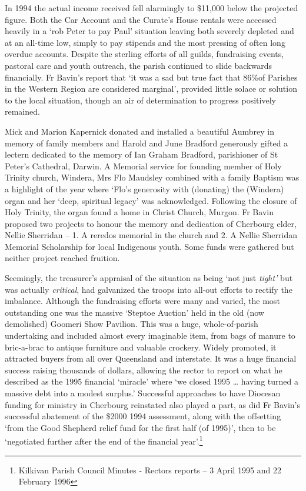 In 1994 the actual income received fell alarmingly to \$11,000 below the projected figure. Both the Car Account and the Curate's House rentals were accessed heavily in a `rob Peter to pay Paul' situation leaving both severely depleted and at an all-time low, simply to pay stipends and the most pressing of often long overdue accounts. Despite the sterling efforts of all guilds, fundraising events, pastoral care and youth outreach, the parish continued to slide backwards financially. Fr Bavin's report that `it was a sad but true fact that 86\%of Parishes in the Western Region are considered marginal', provided little solace or solution to the local situation, though an air of determination to progress positively remained.



Mick and Marion Kapernick donated and installed a beautiful Aumbrey in memory of family members and Harold and June Bradford generously gifted a lectern dedicated to the memory of Ian Graham Bradford, parishioner of St Peter's Cathedral, Darwin. A Memorial service for founding member of Holy Trinity church, Windera, Mrs Flo Maudsley combined with a family Baptism was a highlight of the year where `Flo's generosity with (donating) the (Windera) organ and her `deep, spiritual legacy' was acknowledged. Following the closure of Holy Trinity, the organ found a home in Christ Church, Murgon. Fr Bavin proposed two projects to honour the memory and dedication of Cherbourg elder, Nellie Sherridan -- 1. A reredos memorial in the church and 2. A Nellie Sherridan Memorial Scholarship for local Indigenous youth. Some funds were gathered but neither project reached fruition.



Seemingly, the treasurer's appraisal of the situation as being `not just \emph{tight'} but was actually \emph{critical}, had galvanized the troops into all-out efforts to rectify the imbalance. Although the fundraising efforts were many and varied, the most outstanding one was the massive `Steptoe Auction' held in the old (now demolished) Goomeri Show Pavilion. This was a huge, whole-of-parish undertaking and included almost every imaginable item, from bags of manure to bric-a-brac to antique furniture and valuable crockery. Widely promoted, it attracted buyers from all over Queensland and interstate. It was a huge financial success raising thousands of dollars, allowing the rector to report on what he described as the 1995 financial `miracle' where `we closed 1995 \ldots{} having turned a massive debt into a modest surplus.' Successful approaches to have Diocesan funding for ministry in Cherbourg reinstated also played a part, as did Fr Bavin's successful abatement of the \$2000 1994 assessment, along with the offsetting `from the Good Shepherd relief fund for the first half (of 1995)', then to be `negotiated further after the end of the financial year'.\footnote{Kilkivan Parish Council Minutes - Rectors reports -- 3 April 1995 and 22 February 1996}


